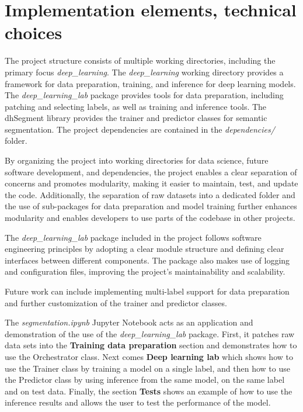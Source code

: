 \documentclass{polytech/polytech}
\numberwithin{figure}{chapter}
\begin{document}
\section{Implementation elements, technical choices}

The project structure consists of multiple working directories, including the primary focus {\it deep_learning}.
The {\it deep_learning} working directory provides a framework for data preparation, training, and inference for deep learning models.
The {\it deep_learning_lab} package provides tools for data preparation, including patching and selecting labels, as well as training and inference tools.
The dhSegment library provides the trainer and predictor classes for semantic segmentation.
The project dependencies are contained in the {\it dependencies/} folder.

By organizing the project into working directories for data science, future software development, and dependencies, the project enables a clear separation of concerns and promotes modularity, making it easier to maintain, test, and update the code.
Additionally, the separation of raw datasets into a dedicated folder and the use of sub-packages for data preparation and model training further enhances modularity and enables developers to use parts of the codebase in other projects.

The {\it deep_learning_lab} package included in the project follows software engineering principles by adopting a clear module structure and defining clear interfaces between different components.
The package also makes use of logging and configuration files, improving the project's maintainability and scalability.

Future work can include implementing multi-label support for data preparation and further customization of the trainer and predictor classes.

The {\it segmentation.ipynb} Jupyter Notebook acts as an application and demonstration of the use of the {\it deep_learning_lab} package.
First, it patches raw data sets into the {\bf Training data preparation} section and demonstrates how to use the Orchestrator class.
Next comes {\bf Deep learning lab} which shows how to use the Trainer class by training a model on a single label, and then how to use the Predictor class by using inference from the same model, on the same label and on test data.
Finally, the section {\bf Tests} shows an example of how to use the inference results and allows the user to test the performance of the model.
\end{document}
